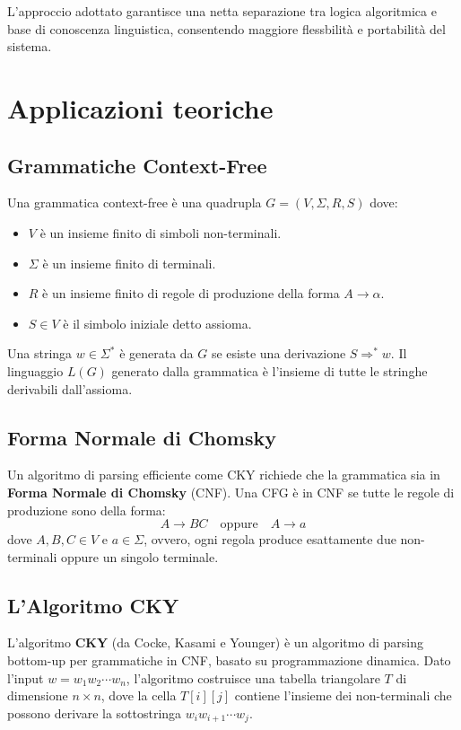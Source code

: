 \documentclass[12pt, a4paper]{article}
\begin{document}
L'approccio adottato garantisce una netta separazione tra logica algoritmica e base di conoscenza linguistica, consentendo maggiore flessbilità e portabilità del sistema.

\section{Applicazioni teoriche}

\subsection{Grammatiche Context-Free}

Una grammatica context-free è una quadrupla $G = (V, \Sigma, R, S)$ dove:
\begin{itemize}
    \item $V$ è un insieme finito di simboli non-terminali.
    \item $\Sigma$ è un insieme finito di terminali.
    \item $R$ è un insieme finito di regole di produzione della forma
          $A \rightarrow \alpha$.
    \item $S \in V$ è il simbolo iniziale detto assioma.
\end{itemize}
Una stringa $w \in \Sigma^*$ è generata da $G$ se esiste una derivazione
$S \Rightarrow^* w$. Il linguaggio $L(G)$ generato dalla grammatica è l'insieme di
tutte le stringhe derivabili dall'assioma.


\subsection{Forma Normale di Chomsky}

Un algoritmo di parsing efficiente come CKY richiede che la grammatica sia in
\textbf{Forma Normale di Chomsky} (CNF). Una CFG è in CNF se tutte le regole
di produzione sono della forma:
\[
    A \rightarrow BC \quad \text{oppure} \quad A \rightarrow a
\]
dove $A, B, C \in V$ e $a \in \Sigma$, ovvero, ogni regola produce
esattamente due non-terminali oppure un singolo terminale.

\subsection{L'Algoritmo CKY}

L'algoritmo \textbf{CKY} (da Cocke, Kasami e Younger) è un algoritmo
di parsing bottom-up per grammatiche in CNF, basato su programmazione dinamica.
Dato l'input $w = w_1 w_2 \cdots w_n$, l'algoritmo costruisce una
tabella triangolare $T$ di dimensione $n \times n$, dove la cella
$T[i][j]$ contiene l'insieme dei non-terminali che possono derivare la sottostringa
$w_i w_{i+1} \cdots w_j$.
\end{document}
